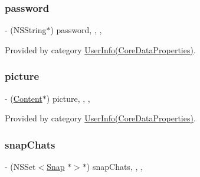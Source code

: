\hypertarget{interface_user_info_a128961270ae5c23c5acbc461bb502083}{}\label{interface_user_info_a128961270ae5c23c5acbc461bb502083} 
\subsubsection{\texorpdfstring{password}{password}}
{\footnotesize\ttfamily -\/ (N\+S\+String$\ast$) password\hspace{0.3cm}{\ttfamily [read]}, {\ttfamily [write]}, {\ttfamily [nonatomic]}, {\ttfamily [retain]}}



Provided by category \hyperlink{category_user_info_07_core_data_properties_08_a128961270ae5c23c5acbc461bb502083}{User\+Info(\+Core\+Data\+Properties)}.

\hypertarget{interface_user_info_abb220fe03fd04d798d5fff55a174a89c}{}\label{interface_user_info_abb220fe03fd04d798d5fff55a174a89c} 
\subsubsection{\texorpdfstring{picture}{picture}}
{\footnotesize\ttfamily -\/ (\hyperlink{interface_content}{Content}$\ast$) picture\hspace{0.3cm}{\ttfamily [read]}, {\ttfamily [write]}, {\ttfamily [nonatomic]}, {\ttfamily [retain]}}



Provided by category \hyperlink{category_user_info_07_core_data_properties_08_abb220fe03fd04d798d5fff55a174a89c}{User\+Info(\+Core\+Data\+Properties)}.

\hypertarget{interface_user_info_afdfa30db3ce1f305298e33e693e626e8}{}\label{interface_user_info_afdfa30db3ce1f305298e33e693e626e8} 
\subsubsection{\texorpdfstring{snap\+Chats}{snapChats}}
{\footnotesize\ttfamily -\/ (N\+S\+Set$<$\hyperlink{interface_snap}{Snap} $\ast$$>$$\ast$) snap\+Chats\hspace{0.3cm}{\ttfamily [read]}, {\ttfamily [write]}, {\ttfamily [nonatomic]}, {\ttfamily [retain]}}



